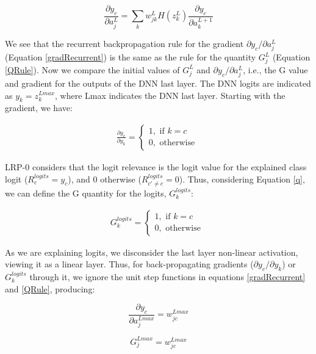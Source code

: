 \documentclass[fleqn,10pt]{wlscirep}
\begin{document}
{\begin{equation}
\label{gradRecurrent}
    \frac{\partial y_{c}}{\partial a_{j}^{L}}= \sum_{k} w_{jk}^{L} H(z_{k}^{L}) \frac{\partial y_{c}}{\partial a_{k}^{L+1}}
\end{equation}

We see that the recurrent backpropagation rule for the gradient $\partial y_{c}/\partial a_{j}^{L}$ (Equation \ref{gradRecurrent}) is the same as the rule for the quantity $G_{j}^{L}$ (Equation \ref{QRule}). Now we compare the initial values of $G_{j}^{L}$ and $\partial y_{c}/\partial a_{j}^{L}$, i.e., the G value and gradient for the outputs of the DNN last layer. The DNN logits are indicated as $y_{k}=z_{k}^{Lmax}$, where Lmax indicates the DNN last layer. Starting with the gradient, we have:

\begin{gather}
\label{initialGRad}
\frac{\partial y_{c}}{\partial y_{k}}=
\begin{cases}
1, \mbox{ if } k=c \\
0,  \mbox{ otherwise }
\end{cases}
\end{gather}

LRP-0 considers that the logit relevance is the logit value for the explained class logit ($R_{c}^{logits}=y_{c}$), and 0 otherwise ($R_{c' \neq c}^{logits}=0$)\cite{LRP}. Thus, considering Equation \ref{q}, we can define the G quantity for the logits, $G_{k}^{logits}$:

\begin{gather}
\label{initialQ}
G_{k}^{logits}=
\begin{cases}
1, \mbox{ if } k=c \\
0,  \mbox{ otherwise }
\end{cases}
\end{gather}

As we are explaining logits, we disconsider the last layer non-linear activation, viewing it as a linear layer. Thus, for back-propagating gradients ($\partial y_{c}/\partial y_{k}$) or $G_{k}^{logits}$ through it, we ignore the unit step functions in equations \ref{gradRecurrent} and \ref{QRule}, producing:

\begin{equation}
\label{iGrad}
    \frac{\partial y_{c}}{\partial a_{j}^{Lmax}}=  w_{jc}^{Lmax}
\end{equation}

\begin{equation}
\label{iQ}
G_{j}^{Lmax}=w_{jc}^{Lmax}
\end{equation}

}
\end{document}
